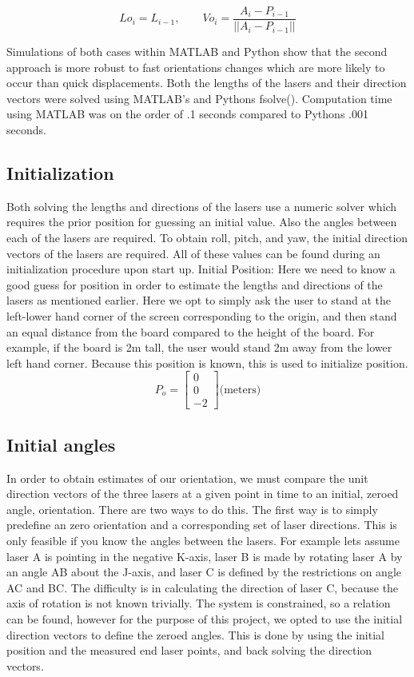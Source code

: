 \documentclass[a4paper]{article}
\begin{document}
\begin{equation}
	Lo_i = L_{i-1}, \qquad Vo_i = \frac{A_i - P_{i-1}}{||A_i -P_{i-1}||}
\end{equation}

Simulations of both cases within MATLAB and Python show that the second approach is more robust to fast orientations changes which are more likely to occur than quick displacements. Both the lengths of the lasers and their direction vectors were solved using MATLAB’s and Pythons fsolve(). Computation time using MATLAB was on the order of .1 seconds compared to Pythons .001 seconds. 

\subsection{Initialization}
Both solving the lengths and directions of the lasers use a numeric solver which requires the prior position for guessing an initial value. Also the angles between each of the lasers are required. To obtain roll, pitch, and yaw, the initial direction vectors of the lasers are required. All of these values can be found during an initialization procedure upon start up. 
Initial Position:
Here we need to know a good guess for position in order to estimate the lengths and directions of the lasers as mentioned earlier. Here we opt to simply ask the user to stand at the left-lower hand corner of the screen corresponding to the origin, and then stand an equal distance from the board compared to the height of the board. For example, if the board is 2m tall, the user would stand 2m away from the lower left hand corner. Because this position is known, this is used to initialize position.
\begin{equation}
P_o = \begin{bmatrix}
0\\ 0 \\-2
\end{bmatrix} \text{(meters)}
\end{equation}

\subsection{Initial angles}
In order to obtain estimates of our orientation, we must compare the unit direction vectors of the three lasers at a given point in time to an initial, zeroed angle, orientation. There are two ways to do this. The first way is to simply predefine an zero orientation and a corresponding set of laser directions. This is only feasible if you know the angles between the lasers. For example lets assume laser A is pointing in the negative  K-axis, laser B is made by rotating laser A by an angle AB about the J-axis, and laser C is defined by the restrictions on angle AC and BC. 
The difficulty is in calculating the direction of laser C, because the axis of rotation is not known trivially. The system is constrained, so a relation can be found, however for the purpose of this project, we opted to use the initial direction vectors to define the zeroed angles. This is done by using the initial position and the measured end laser points, and back solving the direction vectors.
\end{document}
